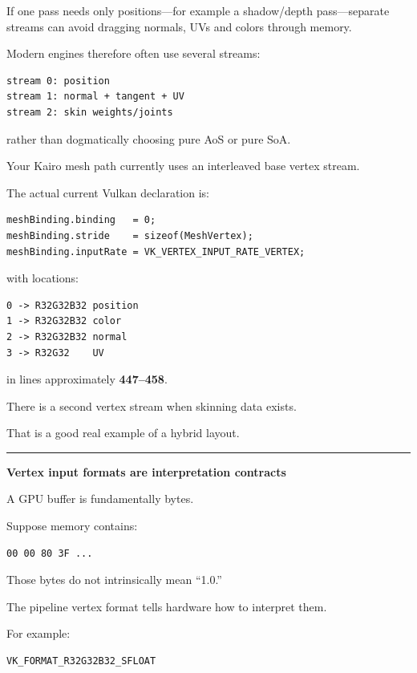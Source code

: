 If one pass needs only positions---for example a shadow/depth pass---separate streams can avoid dragging normals, UVs and colors through memory.

Modern engines therefore often use several streams:

\begin{verbatim}
stream 0: position
stream 1: normal + tangent + UV
stream 2: skin weights/joints
\end{verbatim}

rather than dogmatically choosing pure AoS or pure SoA.

Your Kairo mesh path currently uses an interleaved base vertex stream.

The actual current Vulkan declaration is:

\begin{verbatim}
meshBinding.binding   = 0;
meshBinding.stride    = sizeof(MeshVertex);
meshBinding.inputRate = VK_VERTEX_INPUT_RATE_VERTEX;
\end{verbatim}

with locations:

\begin{verbatim}
0 -> R32G32B32 position
1 -> R32G32B32 color
2 -> R32G32B32 normal
3 -> R32G32    UV
\end{verbatim}

in  lines approximately \textbf{447--458}.

There is a second vertex stream when skinning data exists.

That is a good real example of a hybrid layout.

\begin{center}\rule{0.5\linewidth}{0.5pt}\end{center}

\textbf{Vertex input formats are interpretation contracts}

A GPU buffer is fundamentally bytes.

Suppose memory contains:

\begin{verbatim}
00 00 80 3F ...
\end{verbatim}

Those bytes do not intrinsically mean ``1.0.''

The pipeline vertex format tells hardware how to interpret them.

For example:

\begin{verbatim}
VK_FORMAT_R32G32B32_SFLOAT
\end{verbatim}

